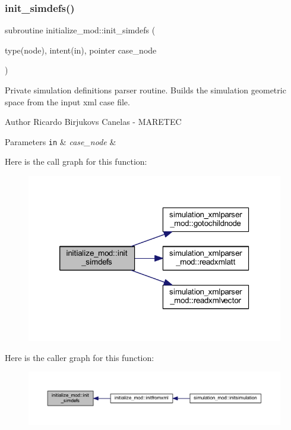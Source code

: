 \subsubsection{\texorpdfstring{init\+\_\+simdefs()}{init\_simdefs()}}
{\footnotesize\ttfamily subroutine initialize\+\_\+mod\+::init\+\_\+simdefs (\begin{DoxyParamCaption}\item[{type(node), intent(in), pointer}]{case\+\_\+node }\end{DoxyParamCaption})\hspace{0.3cm}{\ttfamily [private]}}



Private simulation definitions parser routine. Builds the simulation geometric space from the input xml case file. 

\begin{DoxyAuthor}{Author}
Ricardo Birjukovs Canelas -\/ M\+A\+R\+E\+T\+EC 
\end{DoxyAuthor}

\begin{DoxyParams}[1]{Parameters}
\mbox{\tt in}  & {\em case\+\_\+node} & \\
\hline
\end{DoxyParams}
Here is the call graph for this function\+:\nopagebreak
\begin{figure}[H]
\begin{center}
\leavevmode
\includegraphics[width=320pt]{namespaceinitialize__mod_a18736cca205403067232125b8e510ab2_cgraph}
\end{center}
\end{figure}
Here is the caller graph for this function\+:\nopagebreak
\begin{figure}[H]
\begin{center}
\leavevmode
\includegraphics[width=350pt]{namespaceinitialize__mod_a18736cca205403067232125b8e510ab2_icgraph}
\end{center}
\end{figure}
\mbox{\label{namespaceinitialize__mod_aae6a35bca190cdf65a6146f254264cd1}} 
